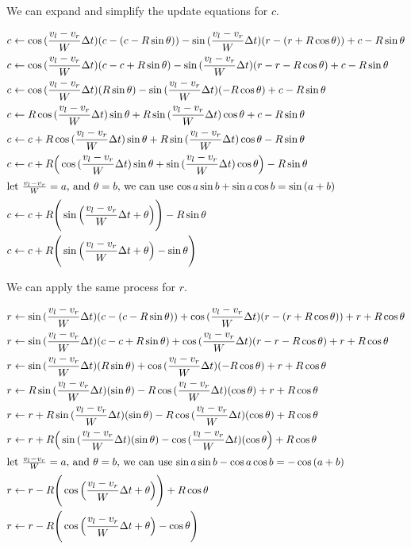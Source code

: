 \documentclass{article}
\begin{document}
We can expand and simplify the update equations for $c$.

\begin{align}
  c &\leftarrow \cos{(\frac{v_l-v_r}{W}\Delta t)}(c-(c-R\sin{\theta}))-\sin{(\frac{v_l-v_r}{W}\Delta t)}(r-(r+R\cos{\theta})) + c-R\sin{\theta} \\
  c &\leftarrow \cos{(\frac{v_l-v_r}{W}\Delta t)}(c-c+R\sin{\theta})-\sin{(\frac{v_l-v_r}{W}\Delta t)}(r-r-R\cos{\theta}) + c-R\sin{\theta} \\
  c &\leftarrow \cos{(\frac{v_l-v_r}{W}\Delta t)}(R\sin{\theta})-\sin{(\frac{v_l-v_r}{W}\Delta t)}(-R\cos{\theta}) + c-R\sin{\theta} \\
  c &\leftarrow R\cos{(\frac{v_l-v_r}{W}\Delta t)}\sin{\theta}+R\sin{(\frac{v_l-v_r}{W}\Delta t)}\cos{\theta} + c-R\sin{\theta} \\
  c &\leftarrow c+R\cos{(\frac{v_l-v_r}{W}\Delta t)}\sin{\theta}+R\sin{(\frac{v_l-v_r}{W}\Delta t)}\cos{\theta}-R\sin{\theta} \\
  c &\leftarrow c+R\Big(\cos{(\frac{v_l-v_r}{W}\Delta t)}\sin{\theta}+\sin{(\frac{v_l-v_r}{W}\Delta t)}\cos{\theta}\Big)-R\sin{\theta} \\
  \shortintertext{let $\frac{v_l-v_r}{W}=a$, and $\theta=b$, we can use $\cos{a}\sin{b}+\sin{a}\cos{b}=\sin{(a+b)}$}
  c &\leftarrow c+R\Bigg(\sin{\Big(\frac{v_l-v_r}{W}\Delta t+\theta}\Big)\Bigg)-R\sin{\theta} \\
  c &\leftarrow c+R\Bigg(\sin{\Big(\frac{v_l-v_r}{W}\Delta t+\theta}\Big)-\sin{\theta}\Bigg)
\end{align}

We can apply the same process for $r$.

\begin{align}
  r &\leftarrow \sin{(\frac{v_l-v_r}{W}\Delta t)}(c-(c-R\sin{\theta}))+\cos{(\frac{v_l-v_r}{W}\Delta t)}(r-(r+R\cos{\theta})) + r+R\cos{\theta} \\
  r &\leftarrow \sin{(\frac{v_l-v_r}{W}\Delta t)}(c-c+R\sin{\theta})+\cos{(\frac{v_l-v_r}{W}\Delta t)}(r-r-R\cos{\theta}) + r+R\cos{\theta} \\
  r &\leftarrow \sin{(\frac{v_l-v_r}{W}\Delta t)}(R\sin{\theta})+\cos{(\frac{v_l-v_r}{W}\Delta t)}(-R\cos{\theta}) + r+R\cos{\theta} \\
  r &\leftarrow R\sin{(\frac{v_l-v_r}{W}\Delta t)}(\sin{\theta})-R\cos{(\frac{v_l-v_r}{W}\Delta t)}(\cos{\theta}) + r+R\cos{\theta} \\
  r &\leftarrow r + R\sin{(\frac{v_l-v_r}{W}\Delta t)}(\sin{\theta})-R\cos{(\frac{v_l-v_r}{W}\Delta t)}(\cos{\theta}) + R\cos{\theta} \\
  r &\leftarrow r + R\Big(\sin{(\frac{v_l-v_r}{W}\Delta t)}(\sin{\theta})-\cos{(\frac{v_l-v_r}{W}\Delta t)}(\cos{\theta}\Big) + R\cos{\theta} \\
  \shortintertext{let $\frac{v_l-v_r}{W}=a$, and $\theta=b$, we can use $\sin{a}\sin{b}-\cos{a}\cos{b}=-\cos{(a+b)}$}
  r &\leftarrow r - R\Bigg(\cos{\Big(\frac{v_l-v_r}{W}\Delta t + \theta\Big)}\Bigg) + R\cos{\theta} \\
  r &\leftarrow r - R\Bigg(\cos{\Big(\frac{v_l-v_r}{W}\Delta t + \theta\Big)} - \cos{\theta}\Bigg)
\end{align}
\end{document}
